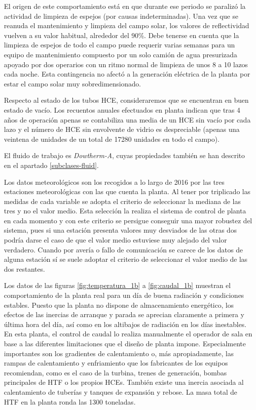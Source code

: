 El origen de este comportamiento está en que durante ese periodo se paralizó la actividad de limpieza de espejos (por causas indeterminadas). Una vez que se reanuda el mantenimiento y limpieza del campo solar, los valores de reflectividad vuelven a su valor habitual, alrededor del 90\%. Debe tenerse en cuenta que la limpieza de espejos de todo el campo puede requerir varias semanas para un equipo de mantenimiento compuesto por un solo camión de agua presurizada apoyado por dos operarios con un ritmo normal de limpieza de unos 8 a 10 lazos cada noche. Esta contingencia no afectó a la generación eléctrica de la planta por estar el campo solar muy sobredimensionado.

Respecto al estado de los tubos HCE, consideraremos que se encuentran en buen estado de vacío. Los recuentos anuales efectuados en planta indican que tras 4 años de operación apenas se contabiliza una media de un HCE sin vacío por cada lazo y el número de HCE sin envolvente de vidrio es despreciable (apenas una veintena de unidades de un total de 17280 unidades en todo el campo).

El fluido de trabajo es \emph{Dowtherm-A}, cuyas propiedades también se han descrito en el apartado \ref{subclases-fluid}.

Los datos meteorológicos son los recogidos a lo largo de 2016 por las tres estaciones meteorológicas con las que cuenta la planta. Al tener por triplicado las medidas de cada variable se adopta el criterio de seleccionar la mediana de las tres y no el valor medio. Esta selección la realiza el sistema de control de planta en cada momento y con este criterio se persigue conseguir una mayor robustez del sistema, pues si una estación presenta valores muy desviados de las otras dos podría darse el caso de que el valor medio estuviese muy alejado del valor  verdadero. Cuando por avería o fallo de comunicación se carece de los datos de alguna estación sí se suele adoptar el criterio de seleccionar el valor medio de las dos restantes.

Los datos de las figuras \ref{fig:temperatura_1b} a \ref{fig:caudal_1b} muestran el comportamiento de la planta real para un día de buena radiación y condiciones estables. Puesto que la planta no dispone de almacenamiento energético, los efectos de las inercias de arranque y parada se aprecian claramente a primera y última hora del día, así como en los altibajos de radiación en los días inestables. En esta planta, el control de caudal lo realiza manualmente el operador de sala en base a las diferentes limitaciones que el diseño de planta impone. Especialmente importantes son los gradientes de calentamiento o, más apropiadamente, las rampas de calentamiento y enfriamiento que los fabricantes de los equipos recomiendan, como es el caso de la turbina, trenes de generación, bombas principales de HTF o los propios HCEs. También existe una inercia asociada al calentamiento de tuberías y tanques de expansión y rebose.  La masa total de HTF en la planta ronda las 1300 toneladas. 

